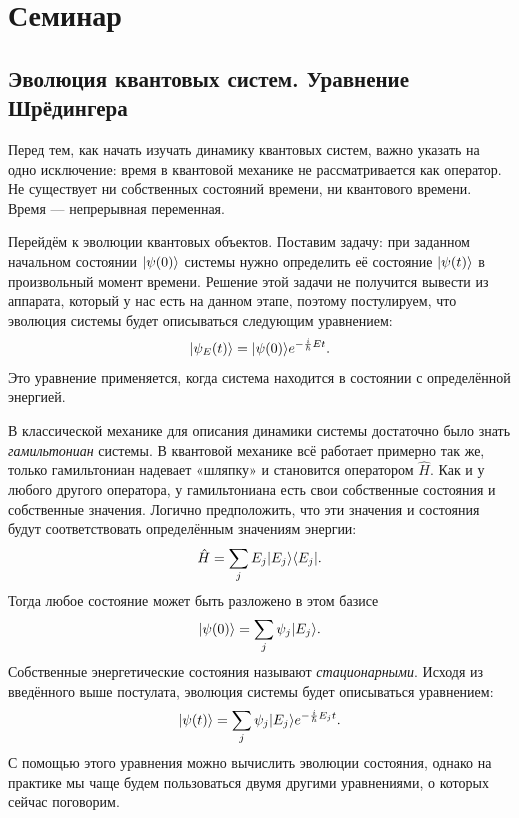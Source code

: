 \section{Семинар \thesection}
\subsection{Эволюция квантовых систем. Уравнение Шрёдингера}
Перед тем, как начать изучать динамику квантовых систем, важно указать на одно
исключение: время в квантовой механике не рассматривается как оператор. Не
существует ни собственных состояний времени, ни квантового времени. Время ---
непрерывная переменная.

Перейдём к эволюции квантовых объектов. Поставим задачу: при заданном начальном
состоянии $\lvert\psi(0)\rangle$ системы нужно определить её состояние $\lvert\psi(t)\rangle$
в произвольный момент времени. Решение этой задачи не получится вывести из
аппарата, который у нас есть на данном этапе, поэтому постулируем, что эволюция
системы будет описываться следующим уравнением:
\[
  \lvert\psi_E(t)\rangle = \lvert\psi(0)\rangle e^{-\frac{i}{\hbar} E t}.
\]
Это уравнение применяется, когда система находится в состоянии с определённой
энергией.

В классической механике для описания динамики системы достаточно было знать
\textit{гамильтониан} системы. В квантовой механике всё работает примерно так
же, только гамильтониан надевает «шляпку» и становится оператором $\hat{H}$.
Как и у любого другого оператора, у гамильтониана есть свои собственные
состояния и собственные значения. Логично предположить, что эти значения и
состояния будут соответствовать определённым значениям энергии:
\[
  \hat{H} = \sum_j E_j \lvert E_j\rangle \langle E_j\rvert.
\]
Тогда любое состояние может быть разложено в этом базисе
\[
  \lvert\psi(0)\rangle = \sum_j \psi_j \lvert E_j\rangle.
\]
Собственные энергетические состояния называют \textit{стационарными}. Исходя из
введённого выше постулата, эволюция системы будет описываться уравнением:
\[
  \lvert\psi(t)\rangle = \sum_j \psi_j \lvert E_j\rangle e^{-\frac{i}{\hbar} E_j t}.
\]
С помощью этого уравнения можно вычислить эволюции состояния, однако на
практике мы чаще будем пользоваться двумя другими уравнениями, о которых сейчас
поговорим.

